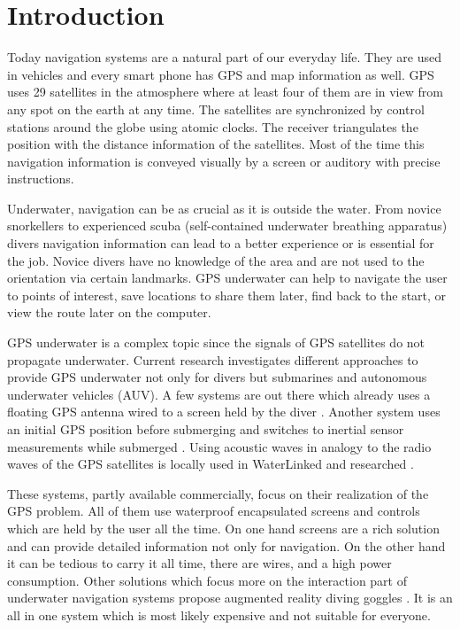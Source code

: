 %

\chapter{Introduction}
\label{introduction}

Today navigation systems are a natural part of our everyday life.
They are used in vehicles and every smart phone has GPS and map information as well.
GPS uses 29 satellites in the atmosphere where at least four of them are in view from any spot on the earth at any time.
The satellites are synchronized by control stations around the globe using atomic clocks.
The receiver triangulates the position with the distance information of the satellites.
Most of the time this navigation information is conveyed visually by a screen or auditory with precise instructions.

Underwater, navigation can be as crucial as it is outside the water.
From novice snorkellers to experienced scuba (self-contained underwater breathing apparatus) divers navigation information can lead to a better experience or is essential for the job.
Novice divers have no knowledge of the area and are not used to the orientation via certain landmarks.
GPS underwater can help to navigate the user to points of interest, save locations to share them later, find back to the start, or view  the route later on the computer. 

GPS underwater is a complex topic since the signals of GPS satellites do not propagate underwater.
Current research investigates different approaches to provide GPS underwater not only for divers but submarines and autonomous underwater vehicles (AUV).
A few systems are out there which already uses a floating GPS antenna wired to a screen held by the diver \citep{navdive}.
Another system uses an initial GPS position before submerging and switches to inertial sensor measurements while submerged \citep{ariadna}.
Using acoustic waves in analogy to the radio waves of the GPS satellites is locally used in WaterLinked \citep{waterlinked} and researched \citep{Taraldsen_UnderwaterGPS}.

These systems, partly available commercially, focus on their realization of the GPS problem.
All of them use waterproof encapsulated screens and controls which are held by the user all the time.
On one hand screens are a rich solution and can provide detailed information not only for navigation.
On the other hand it can be tedious to carry it all time, there are wires, and a high power consumption.
Other solutions which focus more on the interaction part of underwater navigation systems propose augmented reality diving goggles \citep{scubus}.
It is an all in one system which is most likely expensive and not suitable for everyone.

